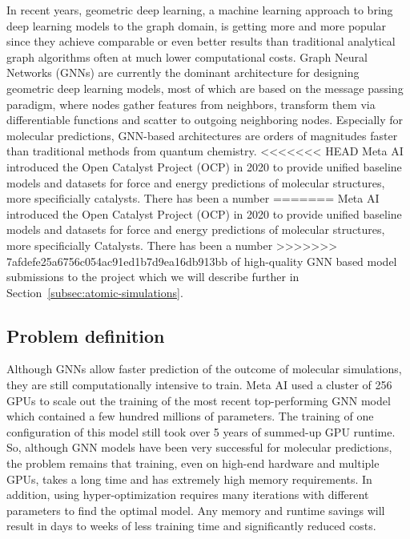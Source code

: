 In recent years, geometric deep learning, a machine learning approach to bring deep learning models 
to the graph domain, is getting more and more popular since they achieve comparable or even better 
results than traditional analytical graph algorithms often at much lower computational costs. Graph Neural 
Networks (GNNs) are currently the dominant architecture for designing geometric deep learning models, most of
which are based on the message passing paradigm, where nodes gather features from neighbors, transform them via 
differentiable functions and scatter to outgoing neighboring nodes. Especially for molecular predictions, 
GNN-based architectures are orders of magnitudes faster than traditional methods from quantum chemistry. 
<<<<<<< HEAD
Meta AI introduced the Open Catalyst Project (OCP) \cite{Chanussot_2021} in 2020 to provide unified baseline models and datasets for 
force and energy predictions of molecular structures, more specificially catalysts. There has been a number 
=======
Meta AI introduced the Open Catalyst Project (OCP) \cite*{Chanussot_2021} in 2020 to provide unified baseline models and datasets for 
force and energy predictions of molecular structures, more specificially Catalysts. There has been a number 
>>>>>>> 7afdefe25a6756c054ac91ed1b7d9ea16db913bb
of high-quality GNN based model submissions 
\cite*{DBLP:journals/corr/abs-2003-03123, https://doi.org/10.48550/arxiv.2106.08903, https://doi.org/10.48550/arxiv.2203.09697} to the project which we will describe further in 
Section~\ref{subsec:atomic-simulations}.

\subsection{Problem definition}

Although GNNs allow faster prediction of the outcome of molecular simulations, they are still computationally intensive 
to train. Meta AI used a cluster of 256 GPUs to scale out the training of the most recent top-performing GNN model 
which contained a few hundred millions of parameters. The training of one configuration of this model still took over 5 
years of summed-up GPU runtime. So, although GNN models have been very successful for molecular predictions, 
the problem remains that training, even on high-end hardware and multiple GPUs, takes a long time and has extremely 
high memory requirements. In addition, using hyper-optimization requires many iterations with different parameters to 
find the optimal model. Any memory and runtime savings will result in days to weeks of less training time and significantly 
reduced costs.

